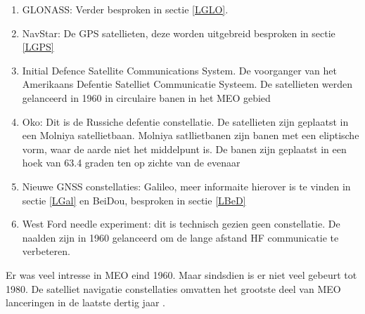 \begin{enumerate}
	\item GLONASS: Verder besproken in sectie \ref{LGLO}. 
	\item NavStar: De GPS satellieten, deze worden uitgebreid besproken in sectie \ref{LGPS}
	\item Initial Defence Satellite Communications System. De voorganger van het Amerikaans Defentie Satelliet Communicatie Systeem. De satellieten werden gelanceerd in 1960 in circulaire banen in het MEO gebied
	\item  Oko: Dit is de Russiche defentie constellatie. De satellieten zijn geplaatst in een Molniya satellietbaan. Molniya satllietbanen zijn banen met een eliptische vorm,  waar de aarde niet het middelpunt is. De banen zijn geplaatst in een hoek van 63.4 graden ten op zichte van de evenaar
	\item Nieuwe GNSS constellaties: Galileo, meer informaite hierover is te vinden in sectie \ref{LGal} en BeiDou, besproken in sectie \ref{LBeD}
	\item West Ford needle experiment: dit is technisch gezien geen constellatie. De naalden zijn in 1960 gelanceerd om de lange afstand HF communicatie te verbeteren. 
\end{enumerate}
Er was veel intresse in MEO eind 1960. Maar sindsdien is er niet veel gebeurt tot 1980. De satelliet navigatie constellaties omvatten het grootste deel van MEO lanceringen in de laatste dertig jaar \cite{LBibMEO}.

